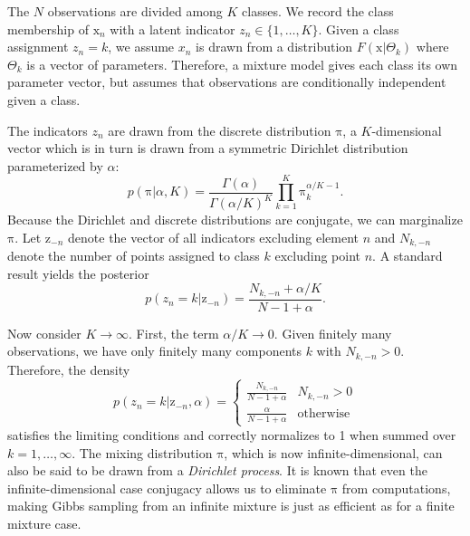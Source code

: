 \documentclass[english]{article}
\newcommand{\+}[1]{\ensuremath{\boldsymbol{\mathrm{#1}}}}
\begin{document}
The $N$ observations are divided among $K$ classes. We record the class membership of $\+{x}_n$ with a latent indicator $z_n \in \{1, \ldots, K \}$. Given a class assignment $z_n = k$, we assume $x_n$ is drawn from a distribution $F(\+{x}|\Theta_k)$ where $\Theta_k$ is a vector of parameters. Therefore, a mixture model gives each class its own parameter vector, but assumes that observations are conditionally independent given a class.

The indicators $z_n$ are drawn from the discrete distribution $\+\pi$, a $K$-dimensional vector which is in turn is drawn from a symmetric Dirichlet distribution parameterized by $\alpha$: $$p \left( \+\pi | \alpha, K \right) = \frac{ \Gamma ( \alpha ) }{ \Gamma ( \alpha/K ) ^K} \prod_{k=1}^K \+\pi_k^{\alpha/K - 1}.$$ Because the Dirichlet and discrete distributions are conjugate, we can marginalize $\+\pi$. Let $\+{z}_{-n}$ denote the vector of all indicators excluding element $n$ and $N_{k,-n}$ denote the number of points assigned to class $k$ excluding point $n$. A standard result \cite{Rasmussen2000} yields the posterior $$p(z_n = k | \+{z}_{-n})  = \frac{ N_{k,-n} + \alpha/K }{ N - 1 + \alpha }.$$

Now consider $K \rightarrow \infty$. First, the term $\alpha / K \rightarrow 0$. Given finitely many observations, we have only finitely many components $k$ with $N_{k,-n} > 0$. Therefore, the density 
\[
p(z_{n}=k|\+{z}_{-n},\alpha)=\begin{cases}
\frac{N_{k,-n}}{N-1+\alpha} & N_{k,-n}>0\\
\frac{\alpha}{N-1+\alpha} & \text{otherwise}
\end{cases} \label{eq:mdp}
\]
satisfies the limiting conditions and correctly normalizes to 1 when summed over $k = 1, \ldots, \infty$. The mixing distribution $\+\pi$, which is now infinite-dimensional, can also be said to be drawn from a \emph{Dirichlet process}. It is known that even the infinite-dimensional case conjugacy allows us to eliminate $\+\pi$ from computations, making Gibbs sampling from an infinite mixture is just as efficient as for a finite mixture case.



\end{document}
